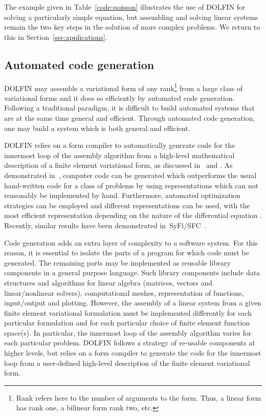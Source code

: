 \documentclass[acmtoms]{acmtrans2m}
\newcommand{\dolfin}{DOLFIN}
\begin{document}
The example given in Table~\ref{code:poisson} illustrates the use of
\dolfin{} for solving a particularly simple equation, but assembling and
solving linear systems remain the two key steps in the solution of
more complex problems. We return to this in
Section~\ref{sec:applications}.

\subsection{Automated code generation}

\dolfin{} may assemble a variational form of any rank\footnote{Rank
  refers here to the number of arguments to the form. Thus, a linear
  form has rank one, a bilinear form rank two, etc.} from a large
class of variational forms and it does so efficiently by automated
code generation. Following a traditional paradigm, it is difficult to
build automated systems that are at the same time general and
efficient. Through automated code generation, one may
build a system which is both general and efficient.

\dolfin{} relies on a form compiler to automatically generate
code for the innermost loop of the assembly algorithm from a
high-level mathematical description of a finite element variational
form, as discussed in~ and .
As demonstrated in~, computer code can be generated
which outperforms the usual hand-written code for a class of problems
by using representations which can not reasonably be implemented by
hand. Furthermore, automated optimization strategies can be employed
\cite{kirby:2005,kirby:2006b,logg:article:11,oelgaard:2009} and
different representations can be used, with the most efficient
representation depending on the nature of the
differential equation \cite{oelgaard:2009}. Recently, similar results
have been demonstrated in~SyFi/SFC~\cite{alnaes:2009}.

Code generation adds an extra layer of complexity to a software
system. For this reason, it is essential to isolate the parts of a
program for which code must be generated. The remaining parts may be
implemented as reusable library components in a general purpose
language. Such library components include data structures and
algorithms for linear algebra (matrices, vectors and linear/nonlinear
solvers), computational meshes, representation of functions,
input/output and plotting. However, the assembly of a linear system
from a given finite element variational formulation must be
implemented differently for each particular formulation and for each
particular choice of finite element function space(s). In particular,
the innermost loop of the assembly algorithm varies for each
particular problem. \dolfin{} follows a strategy of re-usable
components at higher levels, but relies on a form compiler to generate
the code for the innermost loop from a user-defined high-level
description of the finite element variational form.
\end{document}

